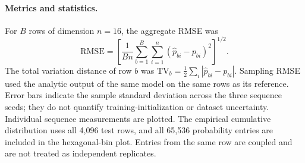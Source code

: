 \paragraph{Metrics and statistics.}
For $B$ rows of dimension $n=16$, the aggregate RMSE was
\begin{equation}
\mathrm{RMSE}=\left[\frac{1}{Bn}\sum_{b=1}^{B}\sum_{i=1}^{n}
(\widehat p_{bi}-p_{bi})^2\right]^{1/2}.
\end{equation}
The total variation distance of row $b$ was
$\mathrm{TV}_b=\frac12\sum_i|\widehat p_{bi}-p_{bi}|$.
Sampling RMSE used the analytic output of the same model on the same rows
as its reference. Error bars indicate the sample standard deviation across
the three sequence seeds; they do not quantify training-initialization or
dataset uncertainty. Individual sequence measurements are plotted. The
empirical cumulative distribution uses all 4,096 test rows, and all 65,536
probability entries are included in the hexagonal-bin plot. Entries from
the same row are coupled and are not treated as independent replicates.
